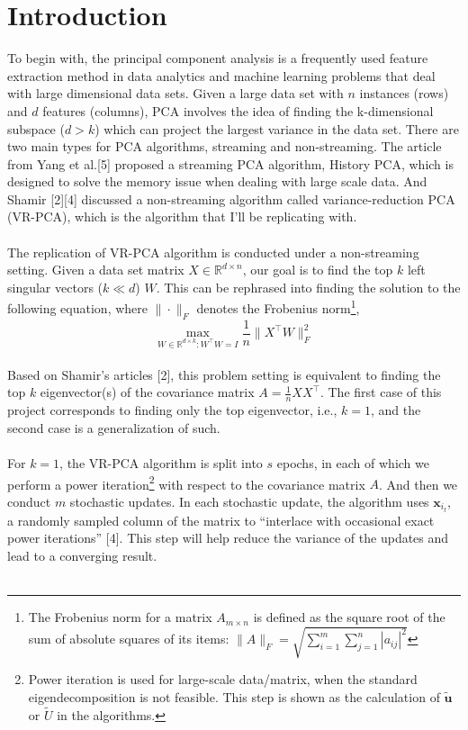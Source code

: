 \documentclass{article}
\begin{document}
\section{Introduction}
To begin with, the principal component analysis is a frequently used feature extraction method in data analytics and machine learning problems that deal with large dimensional data sets. Given a large data set with $n$ instances (rows) and $d$ features (columns), PCA involves the idea of finding the k-dimensional subspace ($d > k$) which can project the largest variance in the data set. There are two main types for PCA algorithms, streaming and non-streaming. The article from Yang et al.[5] proposed a streaming PCA algorithm, History PCA, which is designed to solve the memory issue when dealing with large scale data. And Shamir [2][4] discussed a non-streaming algorithm called variance-reduction PCA (VR-PCA), which is the algorithm that I’ll be replicating with.\\ \\
The replication of VR-PCA algorithm is conducted under a non-streaming setting. Given a data set matrix $X\in\mathbb{R}^{d \times n}$, our goal is to find the top $k$ left singular vectors ($k\ll d$) $W$. This can be rephrased into finding the solution to the following equation, where $\| \cdot \|_F$ denotes the Frobenius norm\footnote{The Frobenius norm for a matrix $A_{m\times n}$ is defined as the square root of the sum of absolute squares of its items: $\|A\|_F=\sqrt{\sum^{m}_{i=1}\sum^{n}_{j=1} |a_{i j}|^2}$},
\begin{equation} \label{first} 
\underset{W \in \mathbb{R}^{d \times k}:W^\top W=I}{\max} \frac{1}{n}\|X^\top W\|_F^2 \end{equation}  
\\ 
Based on Shamir’s articles [2], this problem setting is equivalent to finding the top $k$ eigenvector(s) of the covariance matrix $A=\frac{1}{n}XX^\top$. The first case of this project corresponds to finding only the top eigenvector, i.e., $k = 1$, and the second case is a generalization of such. \\ \\
For $k = 1$, the VR-PCA algorithm is split into $s$ epochs, in each of which we perform a power iteration\footnote{Power iteration is used for large-scale data/matrix, when the standard eigendecomposition is not feasible. This step is shown as the calculation of $\tilde{\textbf{u}}$ or $\tilde{U}$ in the algorithms. } with respect to the covariance matrix $A$. And then we conduct $m$ stochastic updates. In each stochastic update, the algorithm uses $\textbf{x}_{i_t}$, a randomly sampled column of the matrix to “interlace with occasional exact power iterations” [4]. This step will help reduce the variance of the updates and lead to a converging result.\\ \\
\end{document}
